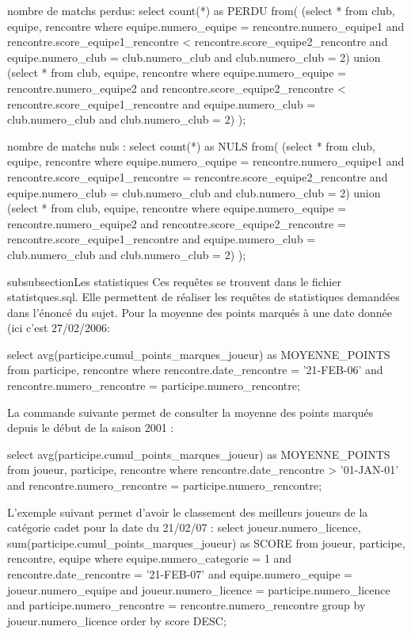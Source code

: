 nombre de matchs perdus:
select count(*) as PERDU
from(
(select *
from club, equipe, rencontre
where equipe.numero_equipe = rencontre.numero_equipe1 
      and rencontre.score_equipe1_rencontre < rencontre.score_equipe2_rencontre
      and equipe.numero_club = club.numero_club
      and club.numero_club = 2)
union
(select *
from club, equipe, rencontre 
where equipe.numero_equipe = rencontre.numero_equipe2
      and rencontre.score_equipe2_rencontre < rencontre.score_equipe1_rencontre
      and equipe.numero_club = club.numero_club
      and club.numero_club = 2)
);

nombre de matchs nuls :
select count(*) as NULS
from(
(select *
from club, equipe, rencontre
where equipe.numero_equipe = rencontre.numero_equipe1 
      and rencontre.score_equipe1_rencontre = rencontre.score_equipe2_rencontre
      and equipe.numero_club = club.numero_club
      and club.numero_club = 2)
union
(select *
from club, equipe, rencontre 
where equipe.numero_equipe = rencontre.numero_equipe2
      and rencontre.score_equipe2_rencontre = rencontre.score_equipe1_rencontre
      and equipe.numero_club = club.numero_club
      and club.numero_club = 2)
);


subsubsection{Les statistiques}
Ces requêtes se trouvent dans le fichier statistques.sql. Elle permettent de réaliser les requêtes de statistiques demandées dans l'énoncé du sujet.
Pour la moyenne des points marqués à une date donnée (ici c'est 27/02/2006:

select avg(participe.cumul_points_marques_joueur) as MOYENNE_POINTS
from participe, rencontre
where rencontre.date_rencontre = '21-FEB-06'
      and rencontre.numero_rencontre = participe.numero_rencontre;

La commande suivante permet de consulter la moyenne des points marqués depuis le début de la saison 2001 :

select avg(participe.cumul_points_marques_joueur) as MOYENNE_POINTS
from joueur, participe, rencontre
where rencontre.date_rencontre > '01-JAN-01'
      and rencontre.numero_rencontre = participe.numero_rencontre;

L'exemple suivant permet d'avoir le classement des meilleurs joueurs de la catégorie cadet pour la date du 21/02/07 :
select joueur.numero_licence, sum(participe.cumul_points_marques_joueur) as SCORE
from joueur, participe, rencontre, equipe
where equipe.numero_categorie = 1
      and rencontre.date_rencontre = '21-FEB-07'
      and equipe.numero_equipe = joueur.numero_equipe
      and joueur.numero_licence = participe.numero_licence
      and participe.numero_rencontre = rencontre.numero_rencontre
group by joueur.numero_licence 
order by score DESC;

